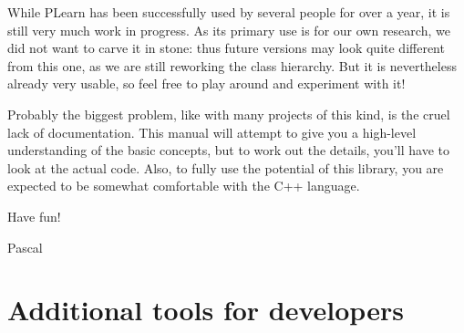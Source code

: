 \documentclass[11pt]{book}
\begin{document}
While PLearn has been successfully used by several people for over
a year, it is still very much work in progress. As its primary use
is for our own research, we did not want to carve it in stone: thus
future versions may look quite different from this one, as we are still
reworking the class hierarchy. But it is nevertheless already very
usable, so feel free to play around and experiment with it!


Probably the biggest problem, like with many projects of this kind, is
the cruel lack of documentation. This manual will attempt to give you
a high-level understanding of the basic concepts, but to work out the
details, you'll have to look at the actual code. Also, to fully use the
potential of this library, you are expected to be somewhat comfortable
with the C++ language.


Have fun!


Pascal

\iffalse

\section{Developer CVS access}

If you are going to contribute to PLearn on Berlios
(\url{http://www.berlios.de}):
\begin{itemize}
\item If you don't have one already, create a Berlios account for yourself
\item Send me ({\tt plearner@users.berlios.de}) your account login,
so that I can add you to the developer list.
\item Make sure the {\tt CVS\_RSH} environment variable is set to
{\tt ssh} in your .cshrc or .bashrc
\item Check-out PLearn as follows(Don't forget to change USERNAME to your username):
\begin{verbatim}
svn checkout svn+ssh://USERNAME@svn.berlios.de/svnroot/repos/plearn/trunk PLearn

\end{verbatim}
\item the current devellopment is on Belios, but in the past Sourceforge was used.
\end{itemize}

\fi

\section{Additional tools for developers}
\end{document}
